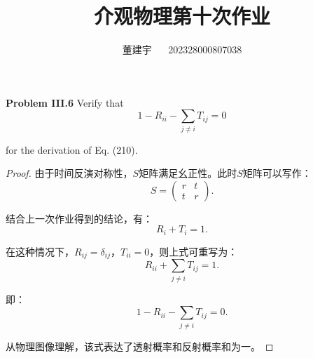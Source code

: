 \documentclass[reqno,a4paper,12pt]{amsart}
\title{介观物理第十次作业}
\author{董建宇 ~~ 202328000807038}
\begin{document}
\maketitle
\titleformat{\section}[hang]{\small}{\thesection}{0.8em}{}{}
\titleformat{\subsection}[hang]{\small}{\thesubsection}{0.8em}{}{}

\textbf{Problem III.6} Verify that 
\[
	1 - R_{ii} - \sum_{j\neq i} T_{ij} = 0
\]

for the derivation of Eq. (210).

\begin{proof}

由于时间反演对称性，$S$矩阵满足幺正性。此时$S$矩阵可以写作：
\[
	S = \left( \begin{matrix}
		r & t \\
		t & r
	\end{matrix} \right).
\]

结合上一次作业得到的结论，有：
\[
	R_i + T_i = 1.
\]

在这种情况下，$R_{ij} = \delta_{ij}$，$T_{ii} = 0$，则上式可重写为：
\[
	R_{ii} + \sum_{j\neq i} T_{ij} = 1.
\]

即：
\[
	1 - R_{ii} - \sum_{j\neq i}T_{ij} = 0.
\]

从物理图像理解，该式表达了透射概率和反射概率和为一。

\end{proof}
\end{document}
